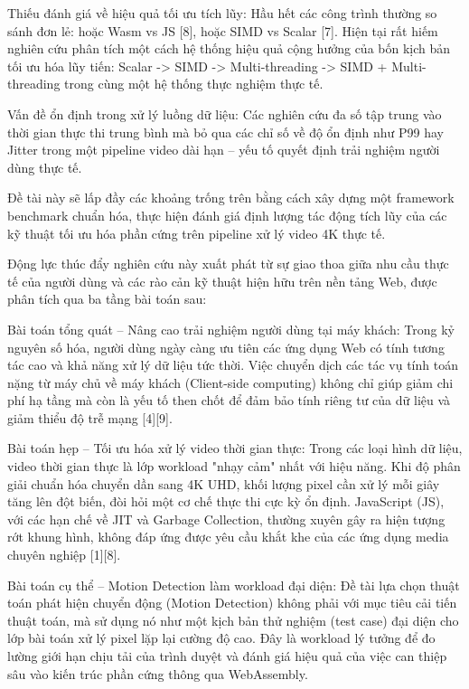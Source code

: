 Thiếu đánh giá về hiệu quả tối ưu tích lũy: Hầu hết các công trình thường so sánh đơn lẻ: hoặc Wasm vs JS [8], hoặc SIMD vs Scalar [7]. Hiện tại rất hiếm nghiên cứu phân tích một cách hệ thống hiệu quả cộng hưởng của bốn kịch bản tối ưu hóa lũy tiến: Scalar -\textgreater{} SIMD -\textgreater{} Multi-threading -\textgreater{} SIMD + Multi-threading trong cùng một hệ thống thực nghiệm thực tế.


Vấn đề ổn định trong xử lý luồng dữ liệu: Các nghiên cứu đa số tập trung vào thời gian thực thi trung bình mà bỏ qua các chỉ số về độ ổn định như P99 hay Jitter trong một pipeline video dài hạn – yếu tố quyết định trải nghiệm người dùng thực tế.


Đề tài này sẽ lấp đầy các khoảng trống trên bằng cách xây dựng một framework benchmark chuẩn hóa, thực hiện đánh giá định lượng tác động tích lũy của các kỹ thuật tối ưu hóa phần cứng trên pipeline xử lý video 4K thực tế.




Động lực thúc đẩy nghiên cứu này xuất phát từ sự giao thoa giữa nhu cầu thực tế của người dùng và các rào cản kỹ thuật hiện hữu trên nền tảng Web, được phân tích qua ba tầng bài toán sau:


Bài toán tổng quát – Nâng cao trải nghiệm người dùng tại máy khách: Trong kỷ nguyên số hóa, người dùng ngày càng ưu tiên các ứng dụng Web có tính tương tác cao và khả năng xử lý dữ liệu tức thời. Việc chuyển dịch các tác vụ tính toán nặng từ máy chủ về máy khách (Client-side computing) không chỉ giúp giảm chi phí hạ tầng mà còn là yếu tố then chốt để đảm bảo tính riêng tư của dữ liệu và giảm thiểu độ trễ mạng [4][9].


Bài toán hẹp – Tối ưu hóa xử lý video thời gian thực: Trong các loại hình dữ liệu, video thời gian thực là lớp workload "nhạy cảm" nhất với hiệu năng. Khi độ phân giải chuẩn hóa chuyển dần sang 4K UHD, khối lượng pixel cần xử lý mỗi giây tăng lên đột biến, đòi hỏi một cơ chế thực thi cực kỳ ổn định. JavaScript (JS), với các hạn chế về JIT và Garbage Collection, thường xuyên gây ra hiện tượng rớt khung hình, không đáp ứng được yêu cầu khắt khe của các ứng dụng media chuyên nghiệp [1][8].


Bài toán cụ thể – Motion Detection làm workload đại diện: Đề tài lựa chọn thuật toán phát hiện chuyển động (Motion Detection) không phải với mục tiêu cải tiến thuật toán, mà sử dụng nó như một kịch bản thử nghiệm (test case) đại diện cho lớp bài toán xử lý pixel lặp lại cường độ cao. Đây là workload lý tưởng để đo lường giới hạn chịu tải của trình duyệt và đánh giá hiệu quả của việc can thiệp sâu vào kiến trúc phần cứng thông qua WebAssembly.


